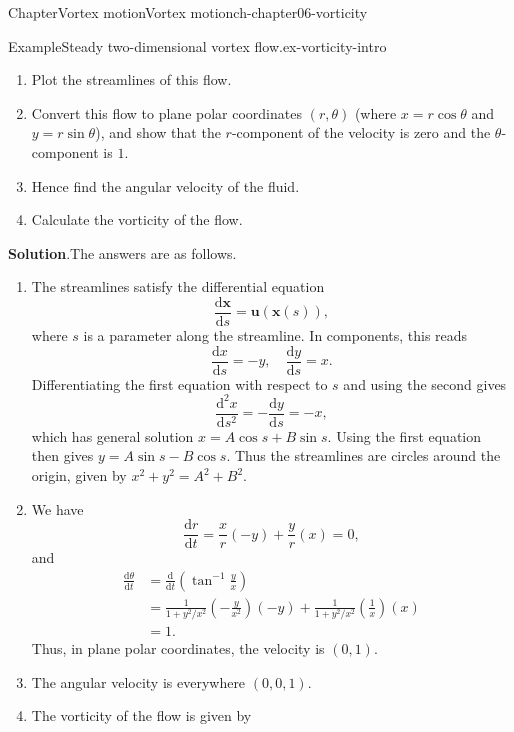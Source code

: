 \documentclass[oneside,10pt,]{book}
\newcommand{\blocktitlefont}{\relax}
\numberwithin{equation}{section}
\newcommand{\de}{\mathrm{d}}
\newcommand{\dd}[2]{\frac{\de#1}{\de#2}}
\newcommand{\bx}{\boldsymbol{x}}
\newcommand{\bu}{\boldsymbol{u}}
\newcommand{\amp}{&}
\begin{document}
\begin{chapterptx}{Chapter}{Vortex motion}{}{Vortex motion}{}{}{ch-chapter06-vorticity}
\begin{introduction}{}
\begin{example}{Example}{Steady two-dimensional vortex flow.}{ex-vorticity-intro}
\par
%
\begin{enumerate}
\item{}Plot the streamlines of this flow.%
\item{}Convert this flow to plane polar coordinates \((r,\theta)\) (where \(x = r\cos\theta\) and \(y = r\sin\theta\)), and show that the \(r\)-component of the velocity is zero and the \(\theta\)-component is \(1\).%
\item{}Hence find the angular velocity of the fluid.%
\item{}Calculate the vorticity of the flow.%
\end{enumerate}
%
\par\smallskip%
\noindent\textbf{\blocktitlefont Solution}.\hypertarget{ex-vorticity-intro-3}{}\quad{}The answers are as follows.%
\begin{enumerate}
\item{}The streamlines satisfy the differential equation%
\begin{equation*}
\dd{\bx}{s}=\bu(\bx(s)),
\end{equation*}
where \(s\) is a parameter along the streamline. In components, this reads%
\begin{equation*}
\dd{x}{s}=-y, \quad \dd{y}{s}=x.
\end{equation*}
Differentiating the first equation with respect to \(s\) and using the second gives%
\begin{equation*}
\dd{^2x}{s^2}=-\dd{y}{s}=-x,
\end{equation*}
which has general solution \(x=A\cos s + B\sin s\). Using the first equation then gives \(y=A\sin s - B\cos s\). Thus the streamlines are circles around the origin, given by \(x^2+y^2=A^2+B^2\).%
\item{}We have%
\begin{equation*}
\dd{r}{t}=\frac{x}{r}(-y)+\frac{y}{r}(x)=0,
\end{equation*}
and%
\begin{align*}
\dd{\theta}{t}\amp=\dd{}{t}\left(\tan^{-1}\frac{y}{x}\right)\\
\amp=\frac{1}{1+y^2/x^2}\left(-\frac{y}{x^2}\right)(-y)+\frac{1}{1+y^2/x^2}\left(\frac{1}{x}\right)(x)\\
\amp=1.
\end{align*}
Thus, in plane polar coordinates, the velocity is \((0,1)\).%
\item{}The angular velocity is everywhere \((0,0,1)\).%
\item{}The vorticity of the flow is given by%

\end{enumerate}
\end{example}
\end{introduction}
\end{chapterptx}
\end{document}
